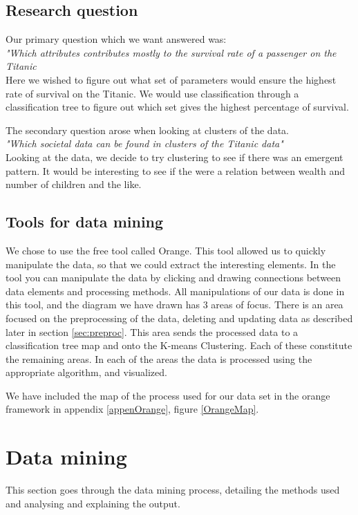 \documentclass[a4paper,11pt]{article}
\begin{document}
\subsection{Research question}
Our primary question which we want answered was:\\
\textit{"Which attributes contributes mostly to the survival rate of a passenger on the Titanic}\\
Here we wished to figure out what set of parameters would ensure the highest rate of survival on the Titanic. We would use classification through a classification tree to figure out which set gives the highest percentage of survival.

The secondary question arose when looking at clusters of the data.\\
\textit{"Which societal data can be found in clusters of the Titanic data"}\\
Looking at the data, we decide to try clustering to see if there was an emergent pattern. It would be interesting to see if the were a relation between wealth and number of children and the like. 
\subsection{Tools for data mining}
We chose to use the free tool called Orange\cite{orange}. This tool allowed us to quickly manipulate the data, so that we could extract the interesting elements. 
In the tool you can manipulate the data by clicking and drawing connections between data elements and processing methods. All manipulations of our data is done in this tool, and the diagram we have drawn has 3 areas of focus. There is an area focused on the preprocessing of the data, deleting and updating data as described later in section \ref{sec:preproc}. This area sends the processed data to a classification tree map and onto the K-means Clustering. Each of these constitute the remaining areas. In each of the areas the data is processed using the appropriate algorithm, and visualized.

We have included the map of the process used for our data set in the orange framework in appendix \ref{appenOrange}, figure \ref{OrangeMap}.

\clearpage
\section{Data mining}
This section goes through the data mining process, detailing the methods used and analysing and explaining the output. 
\end{document}
